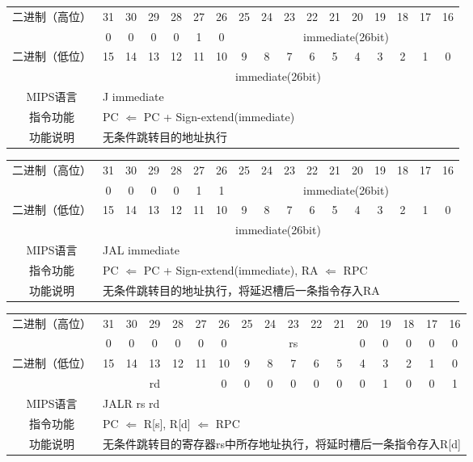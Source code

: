 \begin{table}
\begin{tabular}{|c|c|c|c|c|c|c|c|c|c|c|c|c|c|c|c|c|}
\hline
\multirow{2}{*}{二进制（高位）} &
31&30&29&28&27&26&25&24&23&22&21&20&19&18&17&16\\
\cline{2-17}
&
0&0&0&0&1&
0&
\multicolumn{10}{c|}{immediate(26bit)}\\
\hline
\multirow{2}{*}{二进制（低位）} &
15&14&13&12&11&10&9&8&7&6&5&4&3&2&1&0\\
\cline{2-17}
&
\multicolumn{16}{c|}{immediate(26bit)}\\
\hline
MIPS语言&
\multicolumn{16}{l|}{J immediate}\\
\hline
指令功能&
\multicolumn{16}{l|}{PC $\Leftarrow$ PC + Sign-extend(immediate)}\\
\hline
功能说明&
\multicolumn{16}{l|}{无条件跳转目的地址执行}\\
\hline
\end{tabular}
\end{table}

\begin{table}
\begin{tabular}{|c|c|c|c|c|c|c|c|c|c|c|c|c|c|c|c|c|}
\hline
\multirow{2}{*}{二进制（高位）} &
31&30&29&28&27&26&25&24&23&22&21&20&19&18&17&16\\
\cline{2-17}
&
0&0&0&0&1&
1&
\multicolumn{10}{c|}{immediate(26bit)}\\
\hline
\multirow{2}{*}{二进制（低位）} &
15&14&13&12&11&10&9&8&7&6&5&4&3&2&1&0\\
\cline{2-17}
&
\multicolumn{16}{c|}{immediate(26bit)}\\
\hline
MIPS语言&
\multicolumn{16}{l|}{JAL immediate}\\
\hline
指令功能&
\multicolumn{16}{l|}{PC $\Leftarrow$ PC + Sign-extend(immediate), RA $\Leftarrow$ RPC}\\
\hline
功能说明&
\multicolumn{16}{l|}{无条件跳转目的地址执行，将延迟槽后一条指令存入RA}\\
\hline
\end{tabular}
\end{table}

\clearpage

\begin{table}
\begin{tabular}{|c|c|c|c|c|c|c|c|c|c|c|c|c|c|c|c|c|}
\hline
\multirow{2}{*}{二进制（高位）} &
31&30&29&28&27&26&25&24&23&22&21&20&19&18&17&16\\
\cline{2-17}
&
0&0&0&0&0&
0&
\multicolumn{5}{c|}{rs}&
0&0&0&0&0\\
\hline
\multirow{2}{*}{二进制（低位）} &
15&14&13&12&11&10&9&8&7&6&5&4&3&2&1&0\\
\cline{2-17}
&
\multicolumn{5}{c|}{rd}&
0&0&0&0&0&
0&0&1&0&0&
1\\
\hline
MIPS语言&
\multicolumn{16}{l|}{JALR rs rd}\\
\hline
指令功能&
\multicolumn{16}{l|}{PC $\Leftarrow$ R[s], R[d] $\Leftarrow$ RPC}\\
\hline
功能说明&
\multicolumn{16}{l|}{无条件跳转目的寄存器rs中所存地址执行，将延时槽后一条指令存入R[d]}\\
\hline
\end{tabular}
\end{table}

